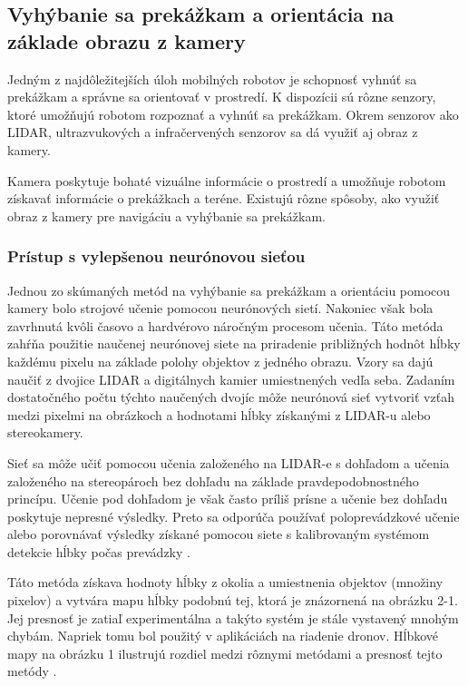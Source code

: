 \subsection{Vyhýbanie sa prekážkam a orientácia na základe obrazu z kamery}
Jedným z najdôležitejších úloh mobilných robotov je schopnosť vyhnúť sa prekážkam a správne sa orientovať v prostredí. K dispozícii sú rôzne senzory, ktoré umožňujú robotom rozpoznať a vyhnúť sa prekážkam. Okrem senzorov ako LIDAR, ultrazvukových a infračervených senzorov sa dá využiť aj obraz z kamery.

Kamera poskytuje bohaté vizuálne informácie o prostredí a umožňuje robotom získavať informácie o prekážkach a teréne. Existujú rôzne spôsoby, ako využiť obraz z kamery pre navigáciu a vyhýbanie sa prekážkam.

\subsubsection{Prístup s vylepšenou neurónovou sieťou}
Jednou zo skúmaných metód na vyhýbanie sa prekážkam a orientáciu pomocou kamery bolo strojové učenie pomocou neurónových sietí. Nakoniec však bola zavrhnutá kvôli časovo a hardvérovo náročným procesom učenia. Táto metóda zahŕňa použitie naučenej neurónovej siete na priradenie približných hodnôt hĺbky každému pixelu na základe polohy objektov z jedného obrazu. Vzory sa dajú naučiť z dvojice LIDAR a digitálnych kamier umiestnených vedľa seba. Zadaním dostatočného počtu týchto naučených dvojíc môže neurónová sieť vytvoriť vzťah medzi pixelmi na obrázkoch a hodnotami hĺbky získanými z LIDAR-u alebo stereokamery.

Sieť sa môže učiť pomocou učenia založeného na LIDAR-e s dohľadom a učenia založeného na stereopároch bez dohľadu na základe pravdepodobnostného princípu. Učenie pod dohľadom je však často príliš prísne a učenie bez dohľadu poskytuje nepresné výsledky. Preto sa odporúča používať poloprevádzkové učenie alebo porovnávať výsledky získané pomocou siete s kalibrovaným systémom detekcie hĺbky počas prevádzky \citep{xie2016edge}.

Táto metóda získava hodnoty hĺbky z okolia a umiestnenia objektov (množiny pixelov) a vytvára mapu hĺbky podobnú tej, ktorá je znázornená na obrázku 2-1. Jej presnosť je zatiaľ experimentálna a takýto systém je stále vystavený mnohým chybám. Napriek tomu bol použitý v aplikáciách na riadenie dronov. Hĺbkové mapy na obrázku 1 ilustrujú rozdiel medzi rôznymi metódami a presnosť tejto metódy \citep{ikeoka2018depth, xie2016edge}.

